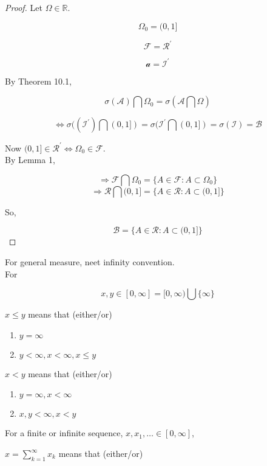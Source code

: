 \documentclass[11pt,fleqn]{book} %
\begin{document}
	\begin{proof}
		Let $\Omega \in \mathbb{R}$. 

		$$ \Omega_0 = (0,1] $$

		$$\mathcal{F} = \mathcal{R}^\prime $$

		$$ \mathcal{a} = \mathcal{I}^\prime$$

		By Theorem 10.1, 

		$$ \sigma(\mathcal{A}) \bigcap \Omega_0 = \sigma(\mathcal{A} \bigcap \Omega)$$

		$$\Leftrightarrow \sigma((\mathcal{I}^\prime) \bigcap (0,1]) = \sigma(\mathcal{I}^\prime \bigcap (0,1]) = \sigma(\mathcal{I}) = \mathcal{B} $$

		Now $(0,1] \in \mathcal{R}^\prime \Leftrightarrow \Omega_0 \in \mathcal{F}$.\\

		By Lemma 1, 

		$$\Rightarrow \mathcal{F} \bigcap \Omega_0 = \{A \in \mathcal{F}: A \subset \Omega_0 \} $$
		$$\Rightarrow \mathcal{R} \bigcap (0,1] = \{A \in \mathcal{R}: A \subset (0,1] \} $$

		So, 

		$$\mathcal{B} = \{A \in \mathcal{R}: A \subset (0,1] \}$$
	\end{proof}


	For general measure, neet infinity convention. \\

	For

		$$x, y \in [0, \infty] = [0, \infty)\bigcup \{\infty\} $$

 		$x \leq y$ means that (either/or)

		\begin{enumerate}
			\item $y = \infty$
			\item $y< \infty, x < \infty, x \leq y$
		\end{enumerate}

		$x < y$ means that (either/or)

		\begin{enumerate}
			\item $y = \infty, x < \infty$
			\item $x, y< \infty,  x < y$
		\end{enumerate}

	For a finite or infinite sequence, $x, x_1, \dots \in [0, \infty]$,

	$x = \displaystyle \sum^\infty_{k=1} x_k $ means that (either/or)
\end{document}
